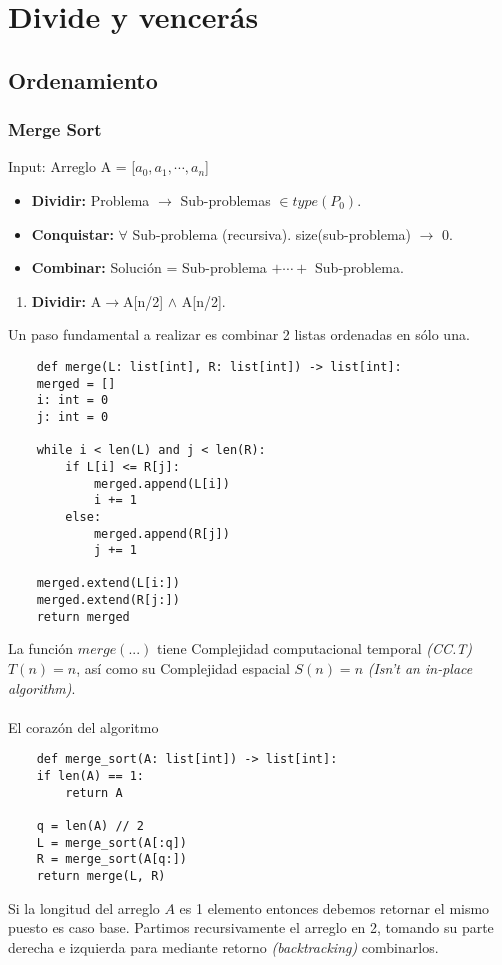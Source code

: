 \chapter{Divide y vencerás}

\section{Ordenamiento}

\subsection{Merge Sort}

Input: Arreglo A = [$a_0, a_1,\cdots,a_n$]

\begin{definition}[Paradigma]
	\begin{itemize}
		Resolución DyV:
		\item \textbf{Dividir:} Problema $\to$ Sub-problemas $\in type(P_0)$.
		\item \textbf{Conquistar:} $\forall$ Sub-problema (recursiva). size(sub-problema) $\to$ 0.
		\item \textbf{Combinar:} Solución = Sub-problema $+\cdots+$ Sub-problema.
	\end{itemize}
\end{definition}

\begin{example}
	\begin{enumerate}
		\item \textbf{Dividir:} A$\to$A[n/2] $\land$ A[n/2].
	\end{enumerate}
\end{example}

Un paso fundamental a realizar es combinar 2 listas ordenadas en sólo una.
\begin{lstlisting}
    def merge(L: list[int], R: list[int]) -> list[int]:
    merged = []
    i: int = 0
    j: int = 0

    while i < len(L) and j < len(R):
        if L[i] <= R[j]:
            merged.append(L[i])
            i += 1
        else:
            merged.append(R[j])
            j += 1

    merged.extend(L[i:])
    merged.extend(R[j:])
    return merged
\end{lstlisting}
La función $merge(...)$ tiene Complejidad computacional temporal \textit{(CC.T)} $T(n)=n$, así como su Complejidad espacial $S(n)=n$ \textit{(Isn't an in-place algorithm)}.
\\\\
El corazón del algoritmo
\begin{lstlisting}
    def merge_sort(A: list[int]) -> list[int]:
    if len(A) == 1:
        return A

    q = len(A) // 2
    L = merge_sort(A[:q])
    R = merge_sort(A[q:])
    return merge(L, R)
\end{lstlisting}
Si la longitud del arreglo $A$ es 1 elemento entonces debemos retornar el mismo puesto es caso base.
Partimos recursivamente el arreglo en 2, tomando su parte derecha e izquierda para mediante retorno \textit{(backtracking)} combinarlos.


